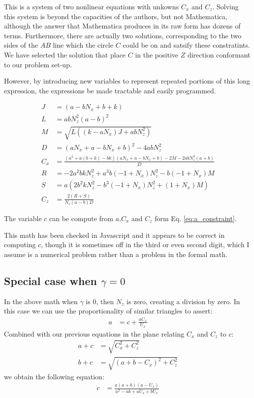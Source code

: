 \documentclass{article}
\begin{document}
This is a system of two nonlinear equations with unkowns $C_x$ and $C_z$.
Solving this system is beyond the capacities of the authors,
but not Mathematica, although the answer that Mathematica produces
in its raw form has dozens of terms.
Furthermore, there are actually two solutions, corresponding
to the two sides of the $AB$ line which the circle $C$ could be
on and satsify these constratints.
We have selected the solution that place $C$ in the positive $Z$
direction conformant to our problem set-up.

However, by introducing new variables to represent repeated
portions of this long expression, the expressions be
made tractable and easily programmed.

\begin{align}
  J &= (a-b N_x+b+k) \\
  L &= a b N_z^2 (a-b)^2  \\
  M &= \sqrt{L  \left((k - a  N_x) J +a b
    N_z^2\right)}\\
  D &= (a N_x+a-b N_x+b)^2-4 a b N_z^2 \\
  C_x &= \frac{\left(a^2+a (b+k)-b
    k\right)
    (a N_x+a-b N_x+b) - 2 M -2 a b N_z^2 (a+b)}{D} \\
  R &=   -2 a^2 b k N_z^2 + a^3b(-1 + N_x) N_z^2 - b(-1 + N_x)M  \\
    S &= a (2 b^2 k N_z^2 - b^3(-1 + N_x)N_z^2 + (1 +N_x) M )
     \\
     C_z &= \frac{2 (R + S)}{N_z (a-b) D}
\end{align}

The variable $c$ can be compute from $a$,$C_x$ and $C_z$
form Eq. \ref{eq:a_constraint}.

This math has been checked in Javascript and it appears to
be correct in computing $c$,
though it is sometimes off in the third or even second digit,
which I assume is a numerical problem
rather than a problem in the formal math.

\subsection{Special case when $\gamma = 0$}

In the above math when $\gamma$ is $0$, then $N_z$ is zero,
creating a division by zero.
In this case we can use the proportionality of similar
triangles to assert:
\begin{align}
  a &= c + \frac{a C_x}{U_x}
\end{align}
Combined with our previous equations in the plane
relating $C_x$ and $C_z$ to $c$:
\begin{align}
  a + c &= \sqrt{C_x^2 + C_z^2} \\
  b + c &= \sqrt{(a+b-C_x)^2 + C_z^2}
\end{align}
we obtain the following equation:
\begin{align}
c & = \frac{a (a + b) (a - U_x)}{a^2 - a b + a U_x + b U_x}
\end{align}
\end{document}
